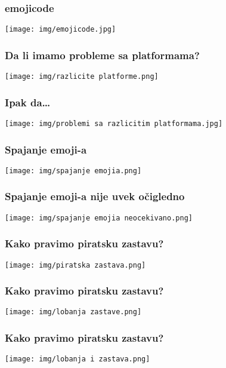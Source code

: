 \documentclass{beamer}
\begin{document}
\begin{frame}
  \frametitle{emojicode}
  \begin{center}
    \texttt{[image: img/emojicode.jpg]}
  \end{center}
\end{frame}

\begin{frame}
  \frametitle{Da li imamo probleme sa platformama?}
  \begin{center}
    \texttt{[image: img/razlicite platforme.png]}
  \end{center}
\end{frame}

\begin{frame}
  \frametitle{Ipak da\dots}
  \begin{center}
    \texttt{[image: img/problemi sa razlicitim platformama.jpg]}
  \end{center}
\end{frame}

\begin{frame}
  \frametitle{Spajanje emoji-a}
  \begin{center}
    \texttt{[image: img/spajanje emojia.png]}
  \end{center}
\end{frame}

\begin{frame}
  \frametitle{Spajanje emoji-a nije uvek očigledno}
  \begin{center}
    \texttt{[image: img/spajanje emojia neocekivano.png]}
  \end{center}
\end{frame}

\begin{frame}
  \frametitle{Kako pravimo piratsku zastavu?}
  \begin{center}
    \texttt{[image: img/piratska zastava.png]}
  \end{center}
\end{frame}

\begin{frame}
  \frametitle{Kako pravimo piratsku zastavu?}
  \begin{center}
    \texttt{[image: img/lobanja zastave.png]}
  \end{center}
\end{frame}

\begin{frame}
  \frametitle{Kako pravimo piratsku zastavu?}
  \begin{center}
    \texttt{[image: img/lobanja i zastava.png]}
  \end{center}
\end{frame}
\end{document}
